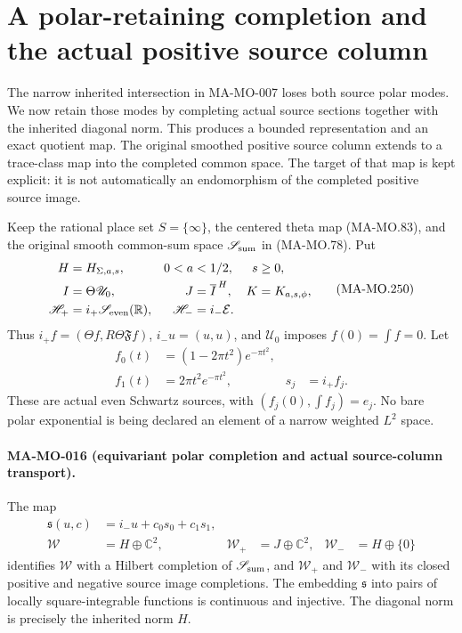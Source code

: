 \section{A polar-retaining completion and the actual positive source column}
\label{sec:polar-source-completion}

The narrow inherited intersection in MA-MO-007 loses both source
polar modes. We now retain those modes by completing actual source
sections together with the inherited diagonal norm. This produces
a bounded representation and an exact quotient map. The original
smoothed positive source column extends to a trace-class map into
the completed common space. The target of that map is kept explicit:
it is not automatically an endomorphism of the completed positive
source image.

Keep the rational place set \(S=\{\infty\}\), the centered theta
map (MA-MO.83), and the original smooth common-sum space
\(\mathscr S_{\rm sum}\) in (MA-MO.78). Put
\[
 \begin{aligned}
 H&=H_{\Sigma,a,s},&0<a&<1/2,&s&\ge0,\\
 I&=\Theta\mathscr U_0,&J&=\overline I^{\,H},
       &K&=K_{a,s,\phi},\\
 \mathscr H_+&=i_+\mathscr S_{\rm even}(\mathbb R),
       &\mathscr H_-&=i_-\mathcal E.
 \end{aligned}
 \tag{MA-MO.250}
\]
Thus \(i_+f=(\Theta f,R\Theta\mathfrak Ff)\),
\(i_-u=(u,u)\), and \(\mathscr U_0\) imposes
\(f(0)=\int f=0\). Let
\[
 \begin{aligned}
 f_0(t)&=(1-2\pi t^2)e^{-\pi t^2},\\
 f_1(t)&=2\pi t^2e^{-\pi t^2},&s_j&=i_+f_j.
 \end{aligned}
 \tag{MA-MO.251}
\]
These are actual even Schwartz sources, with
\((f_j(0),\int f_j)=e_j\). No bare polar exponential is
being declared an element of a narrow weighted \(L^2\) space.

\paragraph{MA-MO-016 (equivariant polar completion and actual source-column
transport).}
The map
\[
 \begin{aligned}
 \mathfrak s(u,c)&=i_-u+c_0s_0+c_1s_1,\\
 \mathcal W&=H\oplus\mathbb C^2,&
 \mathcal W_+&=J\oplus\mathbb C^2,&
 \mathcal W_-&=H\oplus\{0\}
 \end{aligned}
 \tag{MA-MO.252}
\]
identifies \(\mathcal W\) with a Hilbert completion of
\(\mathscr S_{\rm sum}\), and \(\mathcal W_+\) and
\(\mathcal W_-\) with its closed positive and negative source
image completions. The embedding \(\mathfrak s\) into pairs
of locally square-integrable functions is continuous and injective.
The diagonal norm is precisely the inherited norm \(H\).

